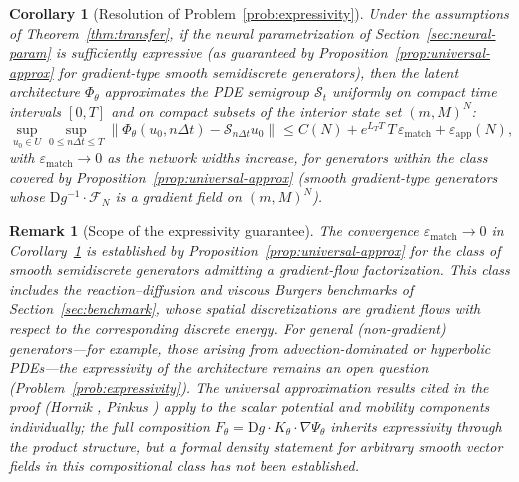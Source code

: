 \documentclass[11pt]{article}
\newtheorem{remark}{Remark}
\newtheorem{corollary}{Corollary}
\newcommand{\cS}{\mathcal{S}}
\newcommand{\cFN}{\mathcal{F}_N}
\newcommand{\PhiT}{\Phi_{\theta}}
\newcommand{\norm}[1]{\left\lVert #1 \right\rVert}
\begin{document}
\begin{corollary}[Resolution of Problem~\ref{prob:expressivity}]\label{cor:resolve-prob1}
Under the assumptions of Theorem~\ref{thm:transfer}, if the neural parametrization of Section~\ref{sec:neural-param} is sufficiently expressive (as guaranteed by Proposition~\ref{prop:universal-approx} for gradient-type smooth semidiscrete generators), then the latent architecture $\PhiT$ approximates the PDE semigroup $\cS_t$ uniformly on compact time intervals $[0,T]$ and on compact subsets of the interior state set $(m,M)^N$:
\begin{equation}\label{eq:cor-prob1-bound}
\sup_{u_0\in U}\sup_{0\le n\Delta t\le T}\norm{\PhiT(u_0,n\Delta t)-\cS_{n\Delta t}u_0}\le C(N)+e^{L_TT}\,T\,\varepsilon_{\mathrm{match}}+\varepsilon_{\mathrm{app}}(N),
\end{equation}
with $\varepsilon_{\mathrm{match}}\to 0$ as the network widths increase, for generators within the class covered by Proposition~\ref{prop:universal-approx} (smooth gradient-type generators whose $\mathrm{D}g^{-1}\cdot \cFN$ is a gradient field on $(m,M)^N$).
\end{corollary}

\begin{remark}[Scope of the expressivity guarantee]\label{rem:expressivity-scope}
The convergence $\varepsilon_{\mathrm{match}}\to 0$ in Corollary~\ref{cor:resolve-prob1} is established by Proposition~\ref{prop:universal-approx} for the class of smooth semidiscrete generators admitting a gradient-flow factorization. This class includes the reaction--diffusion and viscous Burgers benchmarks of Section~\ref{sec:benchmark}, whose spatial discretizations are gradient flows with respect to the corresponding discrete energy. For general (non-gradient) generators---for example, those arising from advection-dominated or hyperbolic PDEs---the expressivity of the architecture remains an open question (Problem~\ref{prob:expressivity}). The universal approximation results cited in the proof (Hornik \cite{Hornik1991Approximation}, Pinkus \cite{Pinkus1999Approximation}) apply to the scalar potential and mobility components individually; the full composition $F_\theta = \mathrm{D}g\cdot K_\theta\cdot \nabla\Psi_\theta$ inherits expressivity through the product structure, but a formal density statement for arbitrary smooth vector fields in this compositional class has not been established.
\end{remark}
\end{document}
